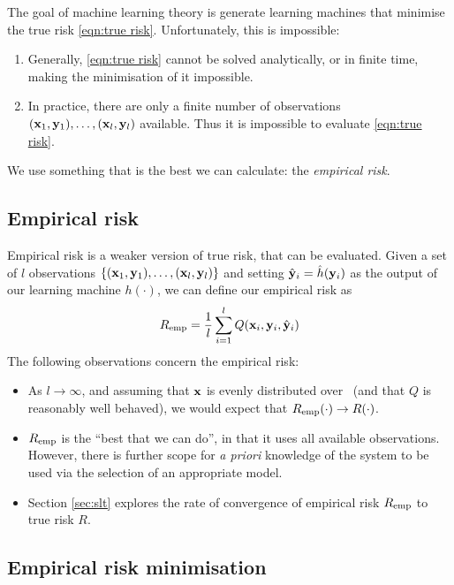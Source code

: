 The goal of machine learning theory is generate learning
machines that minimise the true risk \ref{eqn:true risk}.
Unfortunately, this is impossible:
%
\begin{enumerate}
\item	Generally, \ref{eqn:true risk} cannot be solved analytically,
	or in finite time, making the minimisation of it impossible.
%
\item	In practice, there are only a finite number of observations
	$(\mathbf{x}_1, \mathbf{y}_1), \ldots, (\mathbf{x}_l, \mathbf{y}_l)$ available.  Thus
	it is impossible to evaluate \ref{eqn:true risk}.
\end{enumerate}
%
We use something that is the best we can calculate: the
\emph{empirical risk}.


\subsection{Empirical risk}
Empirical risk is a weaker version of true risk, that can be
evaluated.  Given a set of $l$ observations
$\{(\mathbf{x}_1, \mathbf{y}_1), \ldots, (\mathbf{x}_l, \mathbf{y}_l)\}$ and setting $\hat{\mathbf{y}}_i
= \hat{h}(\mathbf{y}_i)$ as the output of our learning machine $h(\cdot)$,
we can define our empirical risk as 
%
\begin{equation}
R_{\mathrm{emp}} = \frac{1}{l} \sum_{i=1}^{l} Q(\mathbf{x}_i, \mathbf{y}_i, \hat{\mathbf{y}}_i)
\end{equation}
%
The following observations concern the empirical risk:
%
\begin{itemize}
\item 	As $l \rightarrow \infty$, and assuming that $\mathbf{x}$ is evenly
	distributed over \calI\, (and that $Q$ is reasonably well
	behaved), we would expect that $R_{\mathrm{emp}}(\cdot) \rightarrow
	R(\cdot)$.

\item	$R_{\mathrm{emp}}$ is the ``best that we can do'', in that it uses all
	available observations.  However, there is further scope for
	\emph{a priori} knowledge of the system to be used via the
	selection of an appropriate model.

\item	Section \ref{sec:slt} explores the rate of convergence of
	empirical risk $R_{\mathrm{emp}}$ to true risk $R$.
\end{itemize}

\subsection{Empirical risk minimisation}

